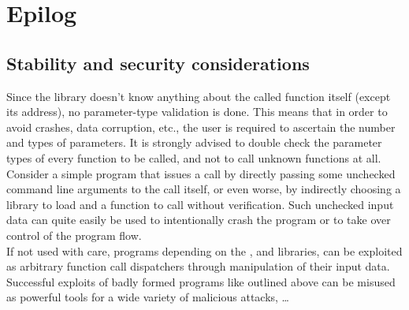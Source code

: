 %
%
%
%

\clearpage

\section{Epilog}

\subsection{Stability and security considerations}

Since the  library doesn't know anything about the called
function itself (except its address), no parameter-type validation is done.
This means that in order to avoid crashes, data corruption, etc., the user is
required to ascertain the number and types of parameters. It is strongly advised to
double check the parameter types of every function to be called, and not to
call unknown functions at all.\\

Consider a simple program that issues a call by directly passing some
unchecked command line arguments to the call itself, or even worse, by indirectly
choosing a library to load and a function to call without verification.
Such unchecked input data can quite easily be used to intentionally crash the
program or to take over control of the program flow.\\
If not used with care, programs depending on the ,
 and  libraries, can be exploited as
arbitrary function call dispatchers through manipulation of their input data.
Successful exploits of badly formed programs like outlined above can be misused
as powerful tools for a wide variety of malicious attacks, \ldots
 

